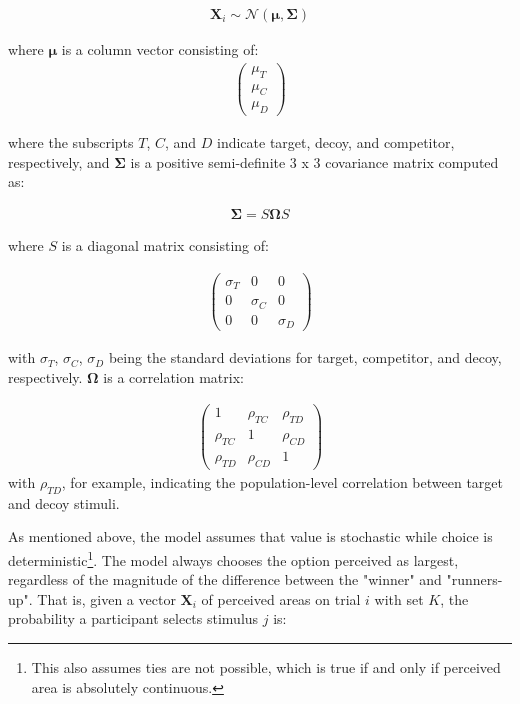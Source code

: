 \begin{align}
   \mathbf{X}_{i} \sim \mathcal{N}(\boldsymbol{\mu}, \boldsymbol{\Sigma})
   \label{eqn:mvnorm}
\end{align}

where $\boldsymbol{\mu}$ is a column vector consisting of:
\begin{align}
   \begin{pmatrix}
      \mu_{T} \\
      \mu_{C} \\
      \mu_{D}
      \end{pmatrix}
   \label{eqn:mu}
\end{align}

where the subscripts $T$, $C$, and $D$ indicate target, decoy, and competitor, respectively, and $\boldsymbol{\Sigma}$ is a positive semi-definite 3 x 3 covariance matrix computed as:

\begin{align}
   \boldsymbol{\Sigma}=S\boldsymbol{\Omega}S
   \label{eqn:Sigma}
\end{align}

where $S$ is a diagonal matrix consisting of: 

\begin{align}
   \begin{pmatrix}
      \sigma_{T} & 0 & 0 \\
      0 & \sigma_{C} & 0 \\
      0 & 0 & \sigma_{D} 
   \end{pmatrix}
\label{eqn:S}
\end{align}

with $\sigma_{T}$, $\sigma_{C}$, $\sigma_{D}$ being the standard deviations for target, competitor, and decoy, respectively. $\boldsymbol{\Omega}$ is a correlation matrix:

\begin{align}
   \begin{pmatrix}
      1 & \rho_{TC} & \rho_{TD} \\
      \rho_{TC} & 1 & \rho_{CD} \\
      \rho_{TD} & \rho_{CD} & 1 
   \end{pmatrix}
\label{eqn:O}
\end{align}
with $\rho_{TD}$, for example, indicating the population-level correlation between target and decoy stimuli.

As mentioned above, the model assumes that value is stochastic while choice is deterministic\footnote{This also assumes ties are not possible, which is true if and only if perceived area is absolutely continuous.}. The model always chooses the option perceived as largest, regardless of the magnitude of the difference between the "winner" and "runners-up". That is, given a vector $\mathbf{X}_i$ of perceived areas on trial $i$ with set $K$, the probability a participant selects stimulus $j$ is:

